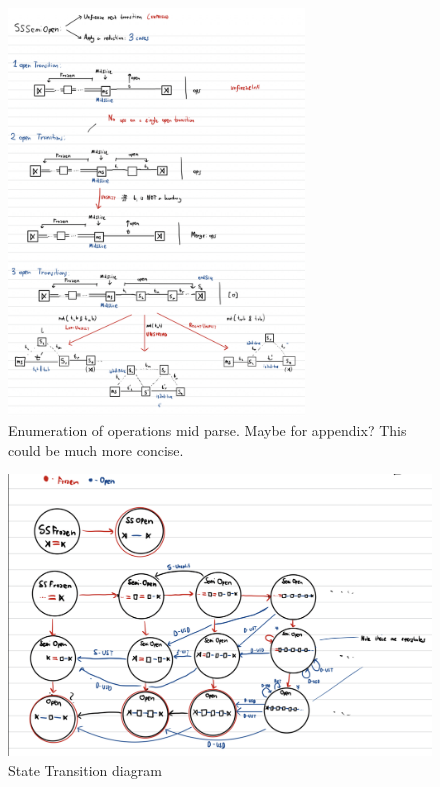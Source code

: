 \documentclass[12pt,a4paper,twoside,openright]{report}
\theoremstyle{definition}
\begin{document}
\begin{figure}[ht]
  \centering
  \includegraphics[width=0.7\textwidth]{sssemiopenenum}
  \caption{Enumeration of operations mid parse. Maybe for appendix? This could be much more concise.}
  \label{fig:sssemiopenenum}
\end{figure}

\begin{figure}[ht]
  \centering
  \includegraphics[width=\textwidth]{statetransitions}
  \caption{State Transition diagram}
  \label{fig:statetrans}
\end{figure}
\FloatBarrier
\end{document}
